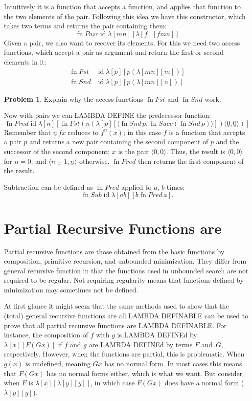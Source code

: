 \documentclass[10pt,a4paper]{article}
\newcommand*{\olup}[1]{\MakeUppercase{#1}}
\theoremstyle{plain}
\theoremstyle{definition}
\newtheorem{prob}{Problem}[section]
\theoremstyle{remark}
\newcommand*{\olfileid}[3]{}
\newcommand*{\olsection}[1]{\section*{#1}}
\providecommand{\tuple}[1]{\langle #1 \rangle}
\providecommand{\num}[1]{\underline{#1}}
\providecommand{\lambd}{\ensuremath{\lambda}}
\providecommand{\ident}{\operatorname{id}}
\providecommand{\fn}{\operatorname{fn}}
\begin{document}
Intuitively it is a function that accepts a function, and applies that
function to the two elements of the pair. Following this idea we have
this constructor, which takes two terms and returns the pair containing
them:
\[
  \fn{Pair} \ident \lambd[mn][\lambd[f][fmn]]
\]
Given a pair, we also want to recover its elements.
For this we need two access functions, which accept a pair as argument and
return the first or second elements in it:
\begin{align*}
  \fn{Fst} & \ident \lambd[p][p(\lambd[mn][m])]\\
  \fn{Snd} & \ident \lambd[p][p(\lambd[mn][n])]
\end{align*}

\begin{prob}
  Explain why the access functions $\fn{Fst}$ and $\fn{Snd}$ work.
\end{prob}

Now with pairs we can \olup{lambda define} the predecessor function:
\[
  \fn{Pred} \ident \lambd[n][\fn{Fst}(n (\lambd[p][\tuple{\fn{Snd}\, {p}, \fn{Succ}(\fn{Snd}\, {p})}]) \tuple{\num 0, \num 0})]
\]
Remember that $\num n\, f x$ reduces to $f^{n}(x)$; in this
case $f$ is a function that accepts a pair $p$ and returns a new
pair containing the second component of $p$ and the successor of the
second component; $x$ is the pair $\tuple{0,0}$. Thus, the
result is $\tuple{0,0}$ for $n=0$, and $\tuple{\num{n-1}, \num n}$
otherwise. $\fn{Pred}$ then returns the first component of the result.

Subtraction can be defined as $\fn{Pred}$ applied to $a$, $b$ times:
\[
\fn{Sub} \ident \lambd[ab][b \fn{Pred}\, a].
\]
    




\olfileid{lam}{ldf}{par}
\olsection{Partial Recursive Functions are \usetoken{S}{lambda definable}}

Partial recursive functions are those obtained from the basic
functions by composition, primitive recursion, and unbounded
minimization. They differ from general recursive function in that the
functions used in unbounded search are not required to be regular.
Not requiring regularity means that functions defined by minimization
may sometimes not be defined. 

At first glance it might seem that the same methods used to show that
the (total) general recursive functions are all \olup{lambda definable} can
be used to prove that all partial recursive functions are
\olup{lambda definable}.  For instance, the composition of $f$ with $g$ is
\olup{lambda define}d by $\lambd[x][F (G x)]$ if $f$ and $g$ are
\olup{lambda define}d by terms $F$ and~$G$, respectively. However, when the
functions are partial, this is problematic. When $g(x)$ is undefined,
meaning $G x$ has no normal form. In most cases this means that $F (G
x)$ has no normal forms either, which is what we want.  But consider
when $F$ is $\lambd[x][\lambd[y][y]]$, in which case $F (G x)$ does
have a normal form ($\lambd[y][y]$). 
\end{document}

